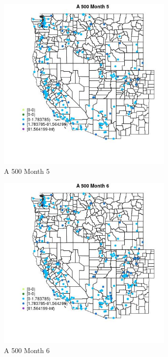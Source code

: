 \begin{figure} 
\centering  
\includegraphics[width=0.77\textwidth]{Code_Outputs/Report_ML_input_PM25_Step4_part_e_de_duplicated_aveswNAs_MapObsMo5A_500.jpg} 
\caption{\label{fig:Report_ML_input_PM25_Step4_part_e_de_duplicated_aveswNAsMapObsMo5A_500}A 500 Month 5} 
\end{figure} 
 

\clearpage 

\begin{figure} 
\centering  
\includegraphics[width=0.77\textwidth]{Code_Outputs/Report_ML_input_PM25_Step4_part_e_de_duplicated_aveswNAs_MapObsMo6A_500.jpg} 
\caption{\label{fig:Report_ML_input_PM25_Step4_part_e_de_duplicated_aveswNAsMapObsMo6A_500}A 500 Month 6} 
\end{figure} 
 

